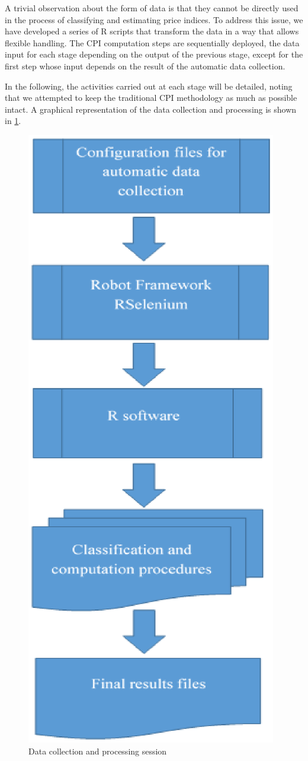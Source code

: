 \documentclass[]{article}
\begin{document}
A trivial observation about the form of data is that they cannot be directly used in the process of classifying 
and estimating price indices. To address this issue, we have developed a series of R scripts that transform 
the data in a way that allows flexible handling. The CPI computation steps are sequentially deployed, the data 
input for each stage depending on the output of the previous stage, except for the first step whose input depends 
on the result of the automatic data collection.



In the following, the activities carried out at each stage will be detailed, noting that we attempted to keep the 
traditional CPI methodology as much as possible intact. A graphical representation of the data collection and processing is shown in \ref{fig:6}.

\begin{figure}
\centering
\includegraphics[width=0.7\linewidth]{fig6.eps}
\caption{Data collection and processing session}
\label{fig:6}
\end{figure}
\end{document}
